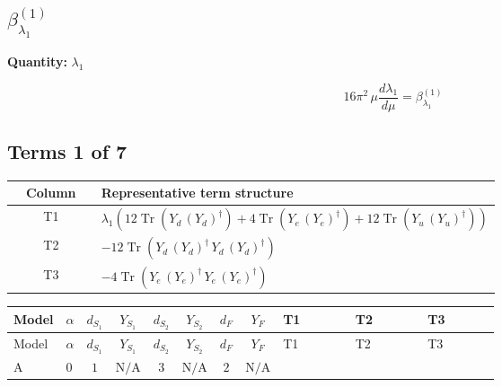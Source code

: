 \documentclass[8pt]{article}
\begin{document}
\begin{landscape}
\section*{$\beta_{\lambda_1}^{(1)}$}
\noindent\textbf{Quantity: }$\lambda_1$\par\smallskip
\[16\pi^2\,\mu\frac{d \lambda_1}{d\mu}=\beta_{\lambda_1}^{(1)}\]
\subsection*{Terms 1 of 7}
\begin{center}
\begin{tabular}{@{}c >{\raggedright\arraybackslash}p{0.82\linewidth}@{}}
\toprule
Column & Representative term structure \\
\midrule
T1 & \(\displaystyle {\lambda_1} (12 \operatorname{Tr}\!\left({Y_d}\,\left({Y_d}\right)^{\dagger}\right)+4 \operatorname{Tr}\!\left({Y_e}\,\left({Y_e}\right)^{\dagger}\right)+12 \operatorname{Tr}\!\left({Y_u}\,\left({Y_u}\right)^{\dagger}\right))\) \\
\midrule
T2 & \(\displaystyle -12 \operatorname{Tr}\!\left({Y_d}\,\left({Y_d}\right)^{\dagger}\,{Y_d}\,\left({Y_d}\right)^{\dagger}\right)\) \\
\midrule
T3 & \(\displaystyle -4 \operatorname{Tr}\!\left({Y_e}\,\left({Y_e}\right)^{\dagger}\,{Y_e}\,\left({Y_e}\right)^{\dagger}\right)\) \\
\midrule
\bottomrule
\end{tabular}
\end{center}
\smallskip
\tiny
\begin{longtable}{@{}llcccccc >{\raggedright\arraybackslash}p{0.21\linewidth} >{\raggedright\arraybackslash}p{0.21\linewidth} >{\raggedright\arraybackslash}p{0.21\linewidth}@{}}
\toprule
Model & $\alpha$ & $d_{S_1}$ & $Y_{S_1}$ & $d_{S_2}$ & $Y_{S_2}$ & $d_F$ & $Y_F$ & T1 & T2 & T3 \\
\midrule
\endfirsthead
\toprule
Model & $\alpha$ & $d_{S_1}$ & $Y_{S_1}$ & $d_{S_2}$ & $Y_{S_2}$ & $d_F$ & $Y_F$ & T1 & T2 & T3 \\
\midrule
\endhead
A & $0$ & $1$ & $\text{N/A}$ & $3$ & $\text{N/A}$ & $2$ & $\text{N/A}$ & \scriptsize\adjustbox{max width=\linewidth}{$\begin{gathered} {\lambda_1} (12 \operatorname{Tr}\!\left({Y_d}\,\left({Y_d}\right)^{\dagger}\right)+4 \operatorname{Tr}\!\left({Y_e}\,\left({Y_e}\right)^{\dagger}\right)+12 \operatorname{Tr}\!\left({Y_u}\,\left({Y_u}\right)^{\dagger}\right))\end{gathered}$} & \scriptsize\adjustbox{max width=\linewidth}{$\begin{gathered} -12 \operatorname{Tr}\!\left({Y_d}\,\left({Y_d}\right)^{\dagger}\,{Y_d}\,\left({Y_d}\right)^{\dagger}\right)\end{gathered}$} & \scriptsize\adjustbox{max width=\linewidth}{$\begin{gathered} -4 \operatorname{Tr}\!\left({Y_e}\,\left({Y_e}\right)^{\dagger}\,{Y_e}\,\left({Y_e}\right)^{\dagger}\right)\end{gathered}$} \\

\end{longtable}
\end{landscape}
\end{document}
